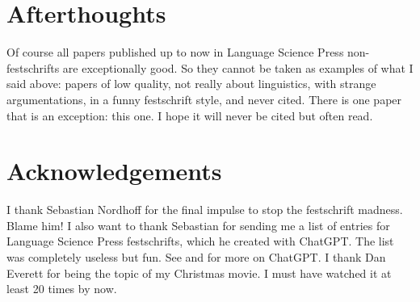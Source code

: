 \documentclass[output=paper,colorlinks,citecolor=brown]{langscibook}
\begin{document}
  


\section*{Afterthoughts}

Of course all papers published up to now in Language Science Press non\hyp fest\-schrifts are exceptionally good. So they
cannot be taken as examples of what I said above: papers of low quality, not really about linguistics,
with strange argumentations, in a funny festschrift style, and never cited. There is one paper that is an
exception: this one. I hope it will never be cited but often read.

\section*{Acknowledgements}

I thank Sebastian Nordhoff for the final impulse to stop the festschrift madness. Blame him! I also
want to thank Sebastian for sending me a list of  entries for Language Science Press
festschrifts, which he created with ChatGPT. The list was completely useless but fun. See
 and \citet{MuellerLLMs} for more on ChatGPT. I thank
Dan Everett for being the topic of my Christmas movie. I must have watched it at least 20 times by now.




{\sloppy\printbibliography[heading=subbibliography,notkeyword=this]}
\end{document}
